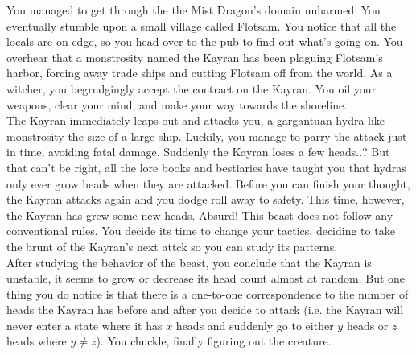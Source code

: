
\noindent You managed to get through the the Mist Dragon's domain unharmed. You eventually stumble upon a small village
called Flotsam. You notice that all the locals are on edge, so you head over to the pub to find out what's going on. You
overhear that a monstrosity named the Kayran has been plaguing Flotsam's harbor, forcing away trade ships and cutting
Flotsam off from the world. As a witcher, you begrudgingly accept the contract on the Kayran. You oil your weapons,
clear your mind, and make your way towards the shoreline.\\

\noindent The Kayran immediately leaps out and attacks you, a gargantuan hydra-like monstrosity the size of a large
ship. Luckily, you manage to parry the attack just in time, avoiding fatal damage. Suddenly the Kayran loses a few
heads..? But that can't be right, all the lore books and bestiaries have taught you that hydras only ever grow heads
when they are attacked. Before you can finish your thought, the Kayran attacks again and you dodge roll away to safety.
This time, however, the Kayran has grew some new heads. Absurd! This beast does not follow any conventional rules. You
decide its time to change your tactics, deciding to take the brunt of the Kayran's next attck so you can study its
patterns. \\

\noindent After studying the behavior of the beast, you conclude that the Kayran is unstable, it seems to grow or
decrease its head count almost at random. But one thing you do notice is that there is a one-to-one correspondence to
the number of heads the Kayran has before and after you decide to attack (i.e. the Kayran will never enter a state where
it has $x$ heads and suddenly go to either $y$ heads or $z$ heads where $y \neq z$). You chuckle, finally figuring out
 the creature.\\

